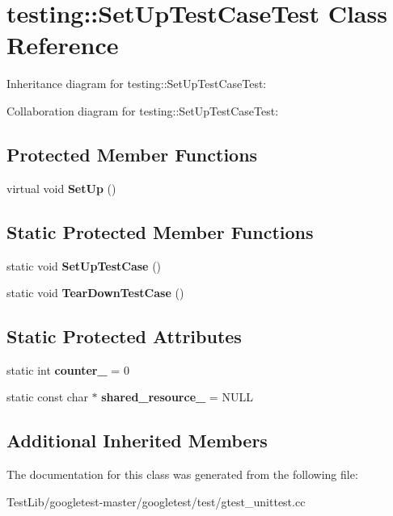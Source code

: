 \hypertarget{classtesting_1_1SetUpTestCaseTest}{}\section{testing\+:\+:Set\+Up\+Test\+Case\+Test Class Reference}
\label{classtesting_1_1SetUpTestCaseTest}


Inheritance diagram for testing\+:\+:Set\+Up\+Test\+Case\+Test\+:


Collaboration diagram for testing\+:\+:Set\+Up\+Test\+Case\+Test\+:
\subsection*{Protected Member Functions}
\begin{DoxyCompactItemize}
\item 
\mbox{\label{classtesting_1_1SetUpTestCaseTest_a4b44551ccf73e66de7ec95b2ab3b2085}} 
virtual void {\bfseries Set\+Up} ()
\end{DoxyCompactItemize}
\subsection*{Static Protected Member Functions}
\begin{DoxyCompactItemize}
\item 
\mbox{\label{classtesting_1_1SetUpTestCaseTest_a50732abc0bcb3725e6dfd6a2d487e944}} 
static void {\bfseries Set\+Up\+Test\+Case} ()
\item 
\mbox{\label{classtesting_1_1SetUpTestCaseTest_abdc133cd161ff2fa317f489da9bdccf3}} 
static void {\bfseries Tear\+Down\+Test\+Case} ()
\end{DoxyCompactItemize}
\subsection*{Static Protected Attributes}
\begin{DoxyCompactItemize}
\item 
\mbox{\label{classtesting_1_1SetUpTestCaseTest_a5b6e811128d35389be49f6569bf93817}} 
static int {\bfseries counter\+\_\+} = 0
\item 
\mbox{\label{classtesting_1_1SetUpTestCaseTest_a904e77fd9a628b6a9aca0280665fd040}} 
static const char $\ast$ {\bfseries shared\+\_\+resource\+\_\+} = N\+U\+LL
\end{DoxyCompactItemize}
\subsection*{Additional Inherited Members}


The documentation for this class was generated from the following file\+:\begin{DoxyCompactItemize}
\item 
Test\+Lib/googletest-\/master/googletest/test/gtest\+\_\+unittest.\+cc\end{DoxyCompactItemize}
